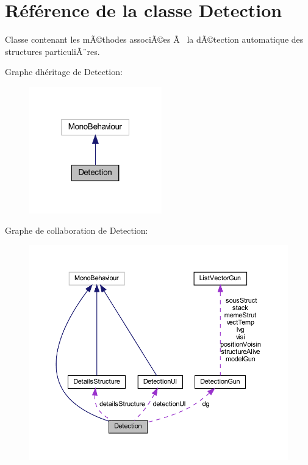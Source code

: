 \hypertarget{class_detection}{}\section{Référence de la classe Detection}
\label{class_detection}


Classe contenant les mÃ©thodes associÃ©es Ã  la dÃ©tection automatique des structures particuliÃ¨res.  




Graphe d\textquotesingle{}héritage de Detection\+:\nopagebreak
\begin{figure}[H]
\begin{center}
\leavevmode
\includegraphics[width=163pt]{class_detection__inherit__graph}
\end{center}
\end{figure}


Graphe de collaboration de Detection\+:
\nopagebreak
\begin{figure}[H]
\begin{center}
\leavevmode
\includegraphics[width=350pt]{class_detection__coll__graph}
\end{center}
\end{figure}
